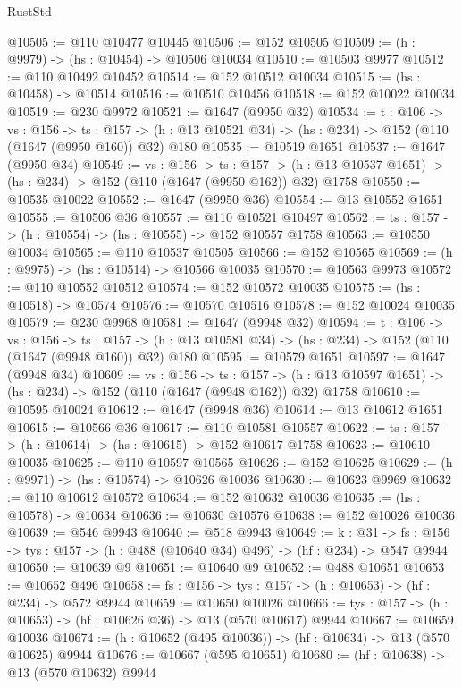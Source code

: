\begin{lexlean}{RustStd}
\begin{coremodule}
@10505 := @110 @10477 @10445
@10506 := @152 @10505
@10509 := (h : @9979) -> (hs : @10454) -> @10506 @10034
@10510 := @10503 @9977
@10512 := @110 @10492 @10452
@10514 := @152 @10512 @10034
@10515 := (hs : @10458) -> @10514
@10516 := @10510 @10456
@10518 := @152 @10022 @10034
@10519 := @230 @9972
@10521 := @1647 (@9950 @32)
@10534 := {t : @106} ->
  {vs : @156} ->
  {ts : @157} -> (h : @13 @10521 @34) -> (hs : @234) -> @152 (@110 (@1647 (@9950 @160)) @32) @180
@10535 := @10519 @1651
@10537 := @1647 (@9950 @34)
@10549 := {vs : @156} ->
  {ts : @157} -> (h : @13 @10537 @1651) -> (hs : @234) -> @152 (@110 (@1647 (@9950 @162)) @32) @1758
@10550 := @10535 @10022
@10552 := @1647 (@9950 @36)
@10554 := @13 @10552 @1651
@10555 := @10506 @36
@10557 := @110 @10521 @10497
@10562 := {ts : @157} -> (h : @10554) -> (hs : @10555) -> @152 @10557 @1758
@10563 := @10550 @10034
@10565 := @110 @10537 @10505
@10566 := @152 @10565
@10569 := (h : @9975) -> (hs : @10514) -> @10566 @10035
@10570 := @10563 @9973
@10572 := @110 @10552 @10512
@10574 := @152 @10572 @10035
@10575 := (hs : @10518) -> @10574
@10576 := @10570 @10516
@10578 := @152 @10024 @10035
@10579 := @230 @9968
@10581 := @1647 (@9948 @32)
@10594 := {t : @106} ->
  {vs : @156} ->
  {ts : @157} -> (h : @13 @10581 @34) -> (hs : @234) -> @152 (@110 (@1647 (@9948 @160)) @32) @180
@10595 := @10579 @1651
@10597 := @1647 (@9948 @34)
@10609 := {vs : @156} ->
  {ts : @157} -> (h : @13 @10597 @1651) -> (hs : @234) -> @152 (@110 (@1647 (@9948 @162)) @32) @1758
@10610 := @10595 @10024
@10612 := @1647 (@9948 @36)
@10614 := @13 @10612 @1651
@10615 := @10566 @36
@10617 := @110 @10581 @10557
@10622 := {ts : @157} -> (h : @10614) -> (hs : @10615) -> @152 @10617 @1758
@10623 := @10610 @10035
@10625 := @110 @10597 @10565
@10626 := @152 @10625
@10629 := (h : @9971) -> (hs : @10574) -> @10626 @10036
@10630 := @10623 @9969
@10632 := @110 @10612 @10572
@10634 := @152 @10632 @10036
@10635 := (hs : @10578) -> @10634
@10636 := @10630 @10576
@10638 := @152 @10026 @10036
@10639 := @546 @9943
@10640 := @518 @9943
@10649 := {k : @31} ->
  {fs : @156} -> {tys : @157} -> (h : @488 (@10640 @34) @496) -> (hf : @234) -> @547 @9944
@10650 := @10639 @9
@10651 := @10640 @9
@10652 := @488 @10651
@10653 := @10652 @496
@10658 := {fs : @156} -> {tys : @157} -> (h : @10653) -> (hf : @234) -> @572 @9944
@10659 := @10650 @10026
@10666 := {tys : @157} -> (h : @10653) -> (hf : @10626 @36) -> @13 (@570 @10617) @9944
@10667 := @10659 @10036
@10674 := (h : @10652 (@495 @10036)) -> (hf : @10634) -> @13 (@570 @10625) @9944
@10676 := @10667 (@595 @10651)
@10680 := (hf : @10638) -> @13 (@570 @10632) @9944

\end{coremodule}
\end{lexlean}
